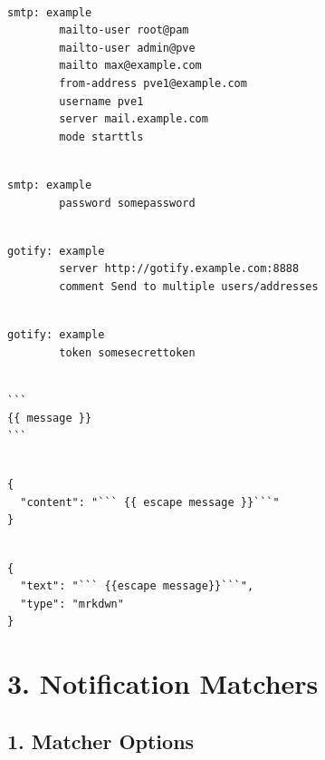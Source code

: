 \begin{lstlisting}

smtp: example
        mailto-user root@pam
        mailto-user admin@pve
        mailto max@example.com
        from-address pve1@example.com
        username pve1
        server mail.example.com
        mode starttls

\end{lstlisting}

\begin{lstlisting}

smtp: example
        password somepassword

\end{lstlisting}

\begin{lstlisting}

gotify: example
        server http://gotify.example.com:8888
        comment Send to multiple users/addresses

\end{lstlisting}

\begin{lstlisting}

gotify: example
        token somesecrettoken

\end{lstlisting}

\begin{lstlisting}

```
{{ message }}
```

\end{lstlisting}

\begin{lstlisting}

{
  "content": "``` {{ escape message }}```"
}

\end{lstlisting}

\begin{lstlisting}

{
  "text": "``` {{escape message}}```",
  "type": "mrkdwn"
}

\end{lstlisting}


\section{3. Notification Matchers}

\subsection{1. Matcher Options}

